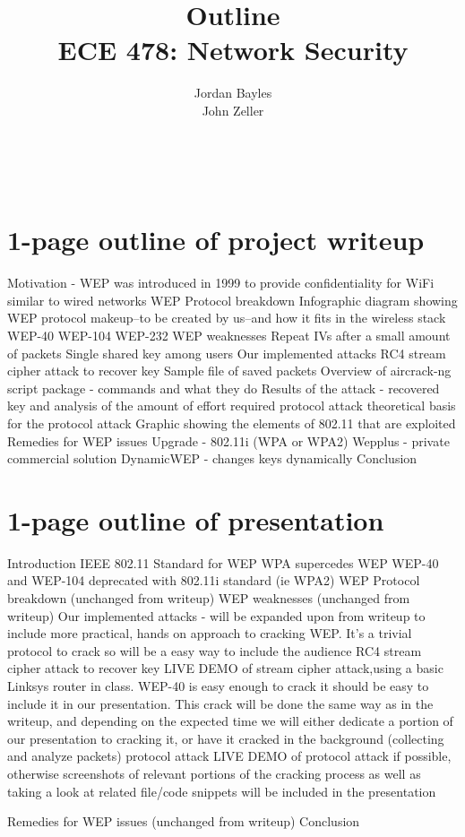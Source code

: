 \documentclass[12pt,letterpaper]{article}
\author{Jordan Bayles\\
John Zeller}
\title{Outline\\
\small ECE 478: Network Security}
\makeatletter
\let\thetitle\@title
\let\theauthor\@author
\let\thedate\@date
\makeatother
\begin{document}
\begin{flushright}
\theauthor\\
\thedate
\end{flushright}
\begin{center}
\thetitle
\end{center}

\section{1-page outline of project writeup}
\begin{outline}
\1 Motivation - WEP was introduced in 1999 to provide confidentiality for WiFi similar to wired networks
\1 WEP Protocol breakdown
    \2 Infographic diagram showing WEP protocol makeup--to be created by us--and how it fits in the wireless stack
    \2 WEP-40
    \2 WEP-104
    \2 WEP-232
\1 WEP weaknesses
    \2 Repeat IVs after a small amount of packets
    \2 Single shared key among users
\1 Our implemented attacks
    \2 RC4 stream cipher attack to recover key
        \3 Sample file of saved packets
        \3 Overview of aircrack-ng script package - commands and what they do
        \3 Results of the attack - recovered key and analysis of the amount of effort required
     protocol attack
        \3 theoretical basis for the protocol attack
        \3 Graphic showing the elements of 802.11 that are exploited
\1 Remedies for WEP issues
    \2 Upgrade - 802.11i (WPA or WPA2)
    \2 Wepplus - private commercial solution
    \2 DynamicWEP - changes keys dynamically
\1 Conclusion
\end{outline}


\newpage
\section{1-page outline of presentation}
\begin{outline}
\1 Introduction
     \2 IEEE 802.11 Standard for WEP
     \2 WPA supercedes WEP
     \2 WEP-40 and WEP-104 deprecated with 802.11i standard (ie WPA2)
\1 WEP Protocol breakdown (unchanged from writeup)
\1 WEP weaknesses (unchanged from writeup)
\1 Our implemented attacks - will be expanded upon from writeup to include more practical, hands on approach to cracking WEP. It’s a trivial protocol to crack so will be a easy way to include the audience
    \2 RC4 stream cipher attack to recover key
        \3 LIVE DEMO of stream cipher attack,using a basic Linksys router in class. WEP-40 is easy enough to crack it should be easy to include it in our presentation. This crack will be done the same way as in the writeup, and depending on the expected time we will either dedicate a portion of our presentation to cracking it, or have it cracked in the background (collecting and analyze packets)
     protocol attack
        \3 LIVE DEMO of protocol attack if possible, otherwise screenshots of relevant portions of the cracking process as well as taking a look at related file/code snippets will be included in the presentation

\1 Remedies for WEP issues (unchanged from writeup)
\1 Conclusion

\end{outline}
\end{document}
